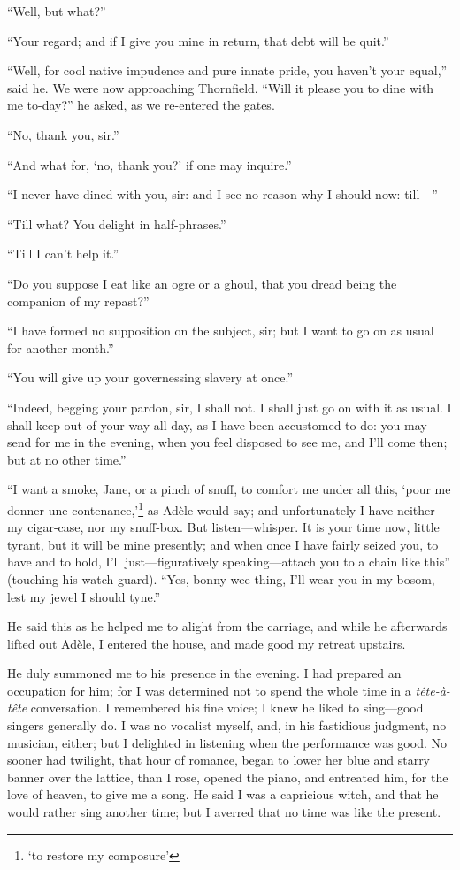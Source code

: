 \enquote{Well, but what?}

\enquote{Your regard; and if I give you mine in return, that debt will
be quit.}

\enquote{Well, for cool native impudence and pure innate pride, you
haven't your equal,} said he.  We were now approaching Thornfield. 
\enquote{Will it please you to dine with me to-day?} he asked, as we
re-entered the gates.

\enquote{No, thank you, sir.}

\enquote{And what for, \enquote{no, thank you?} if one may inquire.}

\enquote{I never have dined with you, sir: and I see no reason why I
should now: till---}

\enquote{Till what?  You delight in half-phrases.}

\enquote{Till I can't help it.}

\enquote{Do you suppose I eat like an ogre or a ghoul, that you dread
being the companion of my repast?}

\enquote{I have formed no supposition on the subject, sir; but I want to
go on as usual for another month.}

\enquote{You will give up your governessing slavery at once.}

\enquote{Indeed, begging your pardon, sir, I shall not.  I shall just go
on with it as usual.  I shall keep out of your way all day, as I have
been accustomed to do: you may send for me in the evening, when you feel
disposed to see me, and I'll come then; but at no other time.}

\enquote{I want a smoke, Jane, or a pinch of snuff, to comfort me under
all this, \foreignquote{french}{pour me donner une contenance,}\footnote{
	\enquote{to restore my composure}} as Adèle would say;
and unfortunately I have neither my cigar-case, nor my snuff-box.  But
listen---whisper.  It is your time now, little tyrant, but it will be
mine presently; and when once I have fairly seized you, to have and to
hold, I'll just---figuratively speaking---attach you to a chain like
this} (touching his watch-guard).  \enquote{Yes, bonny wee thing, I'll
wear you in my bosom, lest my jewel I should tyne.}

He said this as he helped me to alight from the carriage, and while he
afterwards lifted out Adèle, I entered the house, and made good my
retreat upstairs.

He duly summoned me to his presence in the evening.  I had prepared an
occupation for him; for I was determined not to spend the whole time in
a \foreignlanguage{french}{\emph{tête-à-tête}} conversation.  I remembered his fine voice; I knew
he liked to sing---good singers generally do.  I was no vocalist myself,
and, in his fastidious judgment, no musician, either; but I delighted in
listening when the performance was good.  No sooner had twilight, that
hour of romance, began to lower her blue and starry banner over the
lattice, than I rose, opened the piano, and entreated him, for the love
of heaven, to give me a song.  He said I was a capricious witch, and
that he would rather sing another time; but I averred that no time was
like the present.

